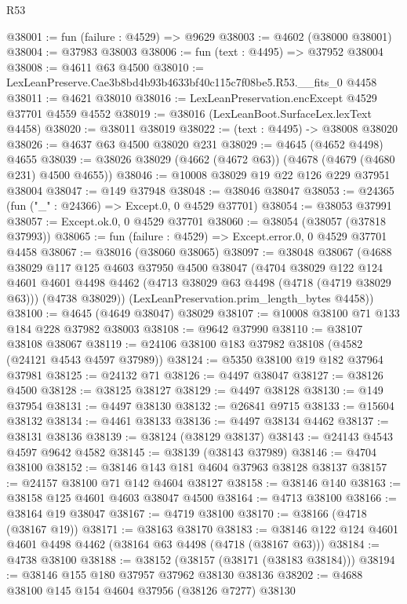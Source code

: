 \begin{lexlean}{R53}
\begin{coremodule}
@38001 := fun (failure : @4529) => @9629
@38003 := @4602 (@38000 @38001)
@38004 := @37983 @38003
@38006 := fun (text : @4495) => @37952 @38004
@38008 := @4611 @63 @4500
@38010 := LexLeanPreserve.Cae3b8bd4b93b4633bf40c115c7f08be5.R53.__fits_0 @4458
@38011 := @4621 @38010
@38016 := LexLeanPreservation.encExcept @4529 @37701 @4559 @4552
@38019 := @38016 (LexLeanBoot.SurfaceLex.lexText @4458)
@38020 := @38011 @38019
@38022 := (text : @4495) -> @38008 @38020
@38026 := @4637 @63 @4500 @38020 @231
@38029 := @4645 (@4652 @4498) @4655
@38039 := @38026 @38029 (@4662 (@4672 @63)) (@4678 (@4679 (@4680 @231) @4500 @4655))
@38046 := @10008 @38029 @19 @22 @126 @229 @37951 @38004
@38047 := @149 @37948
@38048 := @38046 @38047
@38053 := @24365 (fun ("_" : @24366) => Except.{0, 0} @4529 @37701)
@38054 := @38053 @37991
@38057 := Except.ok.{0, 0} @4529 @37701
@38060 := @38054 (@38057 (@37818 @37993))
@38065 := fun (failure : @4529) => Except.error.{0, 0} @4529 @37701 @4458
@38067 := @38016 (@38060 @38065)
@38097 := @38048
    @38067
    (@4688
      @38029
      @117
      @125
      @4603
      @37950
      @4500
      @38047
      (@4704
        @38029
        @122
        @124
        @4601
        @4601
        @4498
        @4462
        (@4713 @38029 @63 @4498 (@4718 (@4719 @38029 @63)))
        (@4738 @38029))
      (LexLeanPreservation.prim_length_bytes @4458))
@38100 := @4645 (@4649 @38047) @38029
@38107 := @10008 @38100 @71 @133 @184 @228 @37982 @38003
@38108 := @9642 @37990
@38110 := @38107 @38108 @38067
@38119 := @24106 @38100 @183 @37982 @38108 (@4582 (@24121 @4543 @4597 @37989))
@38124 := @5350 @38100 @19 @182 @37964 @37981
@38125 := @24132 @71
@38126 := @4497 @38047
@38127 := @38126 @4500
@38128 := @38125 @38127
@38129 := @4497 @38128
@38130 := @149 @37954
@38131 := @4497 @38130
@38132 := @26841 @9715
@38133 := @15604 @38132
@38134 := @4461 @38133
@38136 := @4497 @38134 @4462
@38137 := @38131 @38136
@38139 := @38124 (@38129 @38137)
@38143 := @24143 @4543 @4597 @9642 @4582
@38145 := @38139 (@38143 @37989)
@38146 := @4704 @38100
@38152 := @38146 @143 @181 @4604 @37963 @38128 @38137
@38157 := @24157 @38100 @71 @142 @4604 @38127
@38158 := @38146 @140
@38163 := @38158 @125 @4601 @4603 @38047 @4500
@38164 := @4713 @38100
@38166 := @38164 @19 @38047
@38167 := @4719 @38100
@38170 := @38166 (@4718 (@38167 @19))
@38171 := @38163 @38170
@38183 := @38146 @122 @124 @4601 @4601 @4498 @4462 (@38164 @63 @4498 (@4718 (@38167 @63)))
@38184 := @4738 @38100
@38188 := @38152 (@38157 (@38171 (@38183 @38184)))
@38194 := @38146 @155 @180 @37957 @37962 @38130 @38136
@38202 := @4688 @38100 @145 @154 @4604 @37956 (@38126 @7277) @38130

\end{coremodule}
\end{lexlean}
